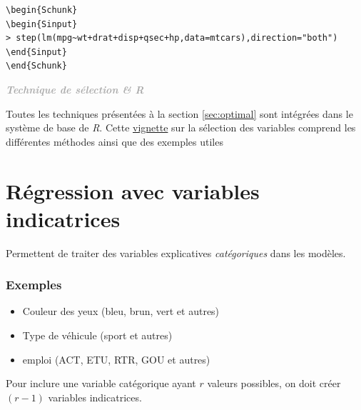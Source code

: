 \documentclass[11pt,french]{report}
\newenvironment{moreInfo}[1]
	{\begin{mdframed}
	\textcolor{darkgray}{\huge \raisebox{-3.5pt}{\faInfo} 
	\hspace{0.5cm} \large\bfseries #1}\\[5pt]
	\normalsize
	\makebox[0.1\textwidth][l]{}	
	\begin{minipage}{10cm}}
	{	\end{minipage}
	\end{mdframed}}
\begin{document}
\begin{lstlisting}[linerange=\\begin\{Sinput\}-\\end\{Sinput\},includerangemarker=false, caption = Code source en R pour l'exemple]
\begin{Schunk}
\begin{Sinput}
> step(lm(mpg~wt+drat+disp+qsec+hp,data=mtcars),direction="both")
\end{Sinput}
\end{Schunk}
\end{lstlisting}

\begin{moreInfo}{\emph{Technique de sélection \& \emph{R}}}
	Toutes les techniques présentées à la section \ref{sec:optimal} sont intégrées dans le système de base de \emph{R}. Cette \href{https://cran.r-project.org/web/packages/olsrr/vignettes/variable_selection.html}{vignette} sur la sélection des variables comprend les différentes méthodes ainsi que des exemples utiles
\end{moreInfo}

\section{Régression avec variables indicatrices}
Permettent de traiter des variables explicatives \emph{catégoriques} dans les modèles.
\subsubsection*{Exemples}
\begin{itemize}
\item Couleur des yeux (bleu, brun, vert et autres)
\item Type de véhicule (sport et autres)
\item emploi (ACT, ETU, RTR, GOU et autres)
\end{itemize}
\bigskip

Pour inclure une variable catégorique ayant $r$ valeurs possibles, on doit créer $(r-1)$ variables indicatrices.
\end{document}
